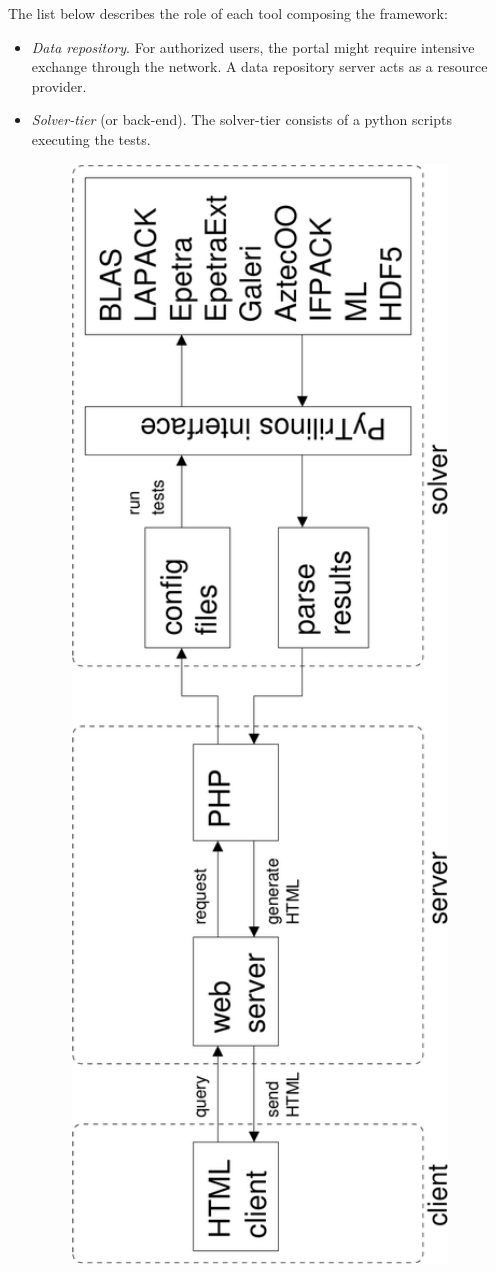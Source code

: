 \documentclass[11pt,relax]{SANDreport}
\begin{document}
The list below describes the role of each tool composing the framework:
\begin{itemize}
\setlength{\itemsep}{0pt}
\item {\sl Data repository}. For authorized users, the portal might require
intensive exchange through the network. A data repository server acts as a
resource provider.
\item {\sl Solver-tier} (or back-end). The solver-tier consists of a python
scripts executing the tests.
\end{itemize}

\begin{figure}
\begin{center}
\includegraphics[width=14cm]{diagram}

\end{center}
\end{figure}
\end{document}
